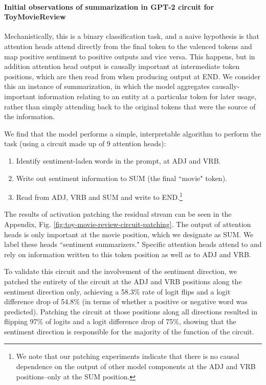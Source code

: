\documentclass{article} %
\newcommand{\tokens}{\fontfamily{qhv}\selectfont \footnotesize}
\begin{document}
        \paragraph{Initial observations of summarization in GPT-2 circuit for ToyMovieReview} Mechanistically, this is a binary classification task, and a naive hypothesis is that attention heads attend directly from the final token to the valenced tokens and map positive sentiment to positive outputs and vice versa. This happens, but in addition attention head output is causally important at intermediate token positions, which are then read from when producing output at {\tokens END}. We consider this an instance of summarization, in which the model aggregates causally-important information relating to an entity at a particular token for later usage, rather than simply attending back to the original tokens that were the source of the information. 
        
        We find that the model performs a simple, interpretable algorithm to perform the task (using a circuit made up of 9 attention heads):

        \begin{enumerate}[leftmargin=0.5cm]
            \item Identify sentiment-laden words in the prompt, at {\tokens ADJ} and {\tokens VRB}.
            \item Write out sentiment information to SUM (the final ``movie" token).
            \item Read from {\tokens ADJ}, {\tokens VRB} and {\tokens SUM} and write to {\tokens END}.\footnote{We note that our patching experiments indicate that there is no causal dependence on the output of other model components at the ADJ and VRB positions--only at the SUM position.}
        \end{enumerate}

        The results of activation patching the residual stream can be seen in the Appendix, Fig. \ref{fig:toy-movie-review-circuit-patching}. The output of attention heads is only important at the {\tokens movie} position, which we designate as {\tokens SUM}. We label these heads ``sentiment summarizers." Specific attention heads attend to and rely on information written to this token position as well as to {\tokens ADJ} and {\tokens VRB}.
        
        To validate this circuit and the involvement of the sentiment direction, we patched the entirety of the circuit at the {\tokens ADJ} and {\tokens VRB} positions along the sentiment direction only, achieving a 58.3\% rate of logit flips and a logit difference drop of 54.8\% (in terms of whether a positive or negative word was predicted). Patching the circuit at those positions along all directions resulted in flipping 97\% of logits and a logit difference drop of 75\%, showing that the sentiment direction is responsible for the majority of the function of the circuit.
\end{document}
